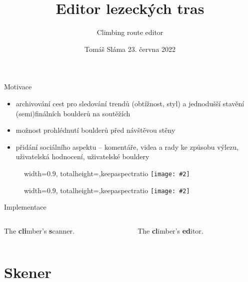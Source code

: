 \documentclass[czech]{beamer}
\title{Editor lezeckých tras}
\subtitle{Climbing route editor}
\author{}
\date{Tomáš Sláma \hfill 23. června 2022}
\makeatletter
\newcommand{\fitimage}[2][\@nil]{
	\begin{figure}
		\begin{adjustbox}{width=0.9\textwidth, totalheight=\textheight-2\baselineskip-2\baselineskip,keepaspectratio}
			\texttt{[image: \#2]}
		\end{adjustbox}
		\def\tmp{#1}%
	 \ifx\tmp\@nnil
			\else
			\caption*{#1}
		\fi
	\end{figure}
}
\makeatother
\begin{document}
	\begin{frame}
		\maketitle
	\end{frame}

	\begin{frame}{Motivace}
		\begin{itemize}
			\item archivování cest pro sledování trendů (obtížnost, styl) a jednodušší stavění (semi)finálních boulderů na soutěžích
			\item možnost prohlédnutí boulderů před návštěvou stěny
			\item přidání sociálního aspektu -- komentáře, videa a rady ke způsobu výlezu, uživatelská hodnocení, uživatelské bouldery
		\end{itemize}

		\begin{minipage}[t]{0.5\textwidth}
			\fitimage{images/capture-1.jpg}
		\end{minipage}%
		\hfill
		\begin{minipage}[t]{0.5\textwidth}
			\fitimage{images/capture-2.jpg}
		\end{minipage}
	\end{frame}

	\begin{frame}{Implementace}
		\begin{columns}[c]
			\begin{column}{0.5\textwidth}
				\begin{center}
					

					The \textbf{cli}mber's \textbf{s}canner.
				\end{center}
			\end{column}
			\begin{column}{0.5\textwidth}
				\begin{center}
					

					The \textbf{cl}imber's \textbf{ed}itor.
				\end{center}
			\end{column}
		\end{columns}

	\end{frame}

	\section{Skener}
\end{document}
